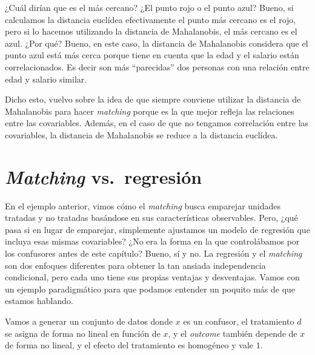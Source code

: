 \documentclass[
  letterpaper,
  DIV=11,
  numbers=noendperiod,
  oneside]{scrreprt}
\begin{document}
¿Cuál dirían que es el más cercano? ¿El punto rojo o el punto azul?
Bueno, si calculamos la distancia euclídea efectivamente el punto más
cercano es el rojo, pero si lo hacemos utilizando la distancia de
Mahalanobis, el más cercano es el azul. ¿Por qué? Bueno, en este caso,
la distancia de Mahalanobis considera que el punto azul está más cerca
porque tiene en cuenta que la edad y el salario están correlacionados.
Es decir son más ``parecidas'' dos personas con una relación entre edad
y salario similar.

Dicho esto, vuelvo sobre la idea de que siempre conviene utilizar la
distancia de Mahalanobis para hacer \emph{matching} porque es la que
mejor refleja las relaciones entre las covariables. Además, en el caso
de que no tengamos correlación entre las covariables, la distancia de
Mahalanobis se reduce a la distancia euclídea.

\hypertarget{sec-matching_vs_reg}{%
\section[\emph{Matching} vs.~regresión]{\texorpdfstring{\emph{Matching}
vs.~regresión}{Matching vs.~regresión}}\label{sec-matching_vs_reg}}

En el ejemplo anterior, vimos cómo el \emph{matching} busca emparejar
unidades tratadas y no tratadas basándose en sus características
observables. Pero, ¿qué pasa si en lugar de emparejar, simplemente
ajustamos un modelo de regresión que incluya esas mismas covariables?
¿No era la forma en la que controlábamos por los confusores antes de
este capítulo? Bueno, sí y no. La regresión y el \emph{matching} son dos
enfoques diferentes para obtener la tan ansiada independencia
condicional, pero cada uno tiene sus propias ventajas y desventajas.
Vamos con un ejemplo paradigmático para que podamos entender un poquito
más de que estamos hablando.

Vamos a generar un conjunto de datos donde \(x\) es un confusor, el
tratamiento \(d\) se asigna de forma no lineal en función de \(x\), y el
\emph{outcome} también depende de \(x\) de forma no lineal, y el efecto
del tratamiento es homogéneo y vale \(1\).
\end{document}
